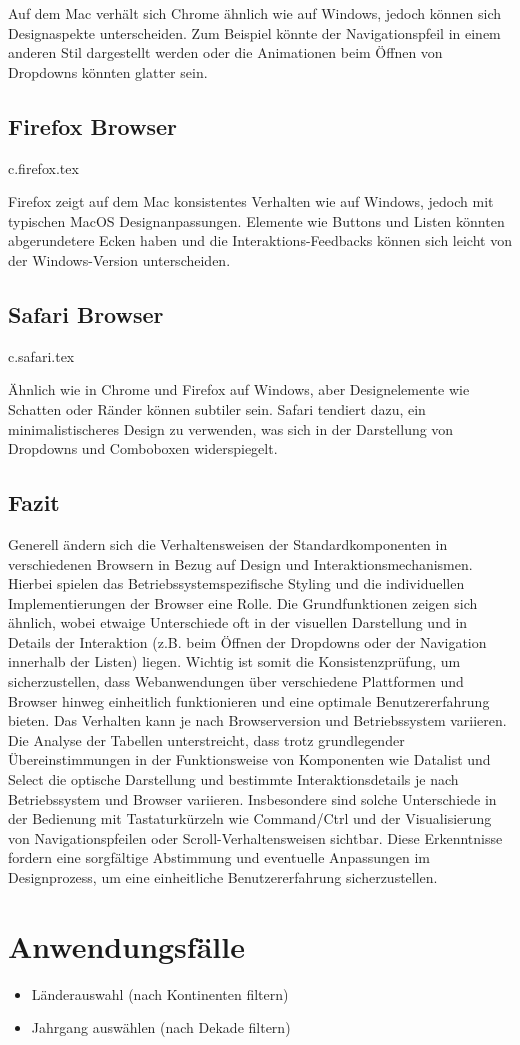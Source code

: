 Auf dem Mac verhält sich Chrome ähnlich wie auf Windows, jedoch können sich Designaspekte unterscheiden. 
Zum Beispiel könnte der Navigationspfeil in einem anderen Stil dargestellt werden oder 
die Animationen beim Öffnen von Dropdowns könnten glatter sein.

\clearpage
\subsection{Firefox Browser}
{c.firefox.tex}

Firefox zeigt auf dem Mac konsistentes Verhalten wie auf Windows, jedoch mit typischen MacOS Designanpassungen. 
Elemente wie Buttons und Listen könnten abgerundetere Ecken haben und 
die Interaktions-Feedbacks können sich leicht von der Windows-Version unterscheiden.

\clearpage
\subsection{Safari Browser}
{c.safari.tex}

Ähnlich wie in Chrome und Firefox auf Windows, aber Designelemente wie Schatten oder Ränder können subtiler sein. 
Safari tendiert dazu, ein minimalistischeres Design zu verwenden, was sich in der Darstellung von Dropdowns und Comboboxen widerspiegelt.


\clearpage
\subsection{Fazit}

Generell ändern sich die Verhaltensweisen der Standardkomponenten in verschiedenen Browsern in Bezug auf Design und Interaktionsmechanismen. 
Hierbei spielen das Betriebssystemspezifische Styling und die individuellen Implementierungen der Browser eine Rolle. Die Grundfunktionen zeigen sich ähnlich, 
wobei etwaige Unterschiede oft in der visuellen Darstellung und in Details der Interaktion (z.B. beim Öffnen der Dropdowns oder der Navigation innerhalb der Listen) liegen. 
Wichtig ist somit die Konsistenzprüfung, um sicherzustellen, dass Webanwendungen über verschiedene Plattformen und Browser hinweg einheitlich funktionieren und eine optimale Benutzererfahrung bieten. 
Das Verhalten kann je nach Browserversion und Betriebssystem variieren. Die Analyse der Tabellen unterstreicht, dass trotz grundlegender Übereinstimmungen in der Funktionsweise von Komponenten wie Datalist und Select 
die optische Darstellung und bestimmte Interaktionsdetails je nach Betriebssystem und Browser variieren. 
Insbesondere sind solche Unterschiede in der Bedienung mit Tastaturkürzeln wie Command/Ctrl und der Visualisierung von Navigationspfeilen oder Scroll-Verhaltensweisen sichtbar. 
Diese Erkenntnisse fordern eine sorgfältige Abstimmung und eventuelle Anpassungen im Designprozess, um eine einheitliche Benutzererfahrung sicherzustellen.


\section{Anwendungsfälle}
\begin{itemize}
    \item Länderauswahl (nach Kontinenten filtern)
    \item Jahrgang auswählen (nach Dekade filtern)
\end{itemize}
